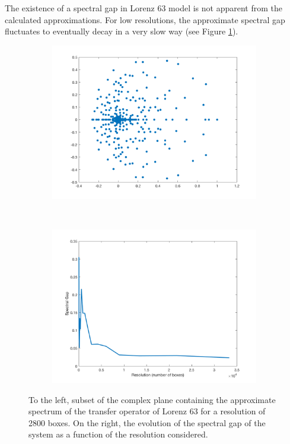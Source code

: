 The existence of a spectral gap in Lorenz 63 model is not apparent from the calculated approximations. For low resolutions, the approximate spectral gap fluctuates to eventually decay in a very slow way (see Figure \ref{sp}).

\begin{figure}[H]
	\centering
	\begin{subfigure}[b]{0.4\textwidth}
		\includegraphics[width=\textwidth]{spectruml63.png}
	\end{subfigure}
	~ %
	\begin{subfigure}[b]{0.4\textwidth}
		\includegraphics[width=\textwidth]{spectralgapl63.png}
	\end{subfigure}
	\caption{\label{sp} To the left, subset of the complex plane containing the approximate spectrum of the transfer operator of Lorenz 63 for a resolution of 2800 boxes. On the right, the evolution of the spectral gap of the system as a function of the resolution considered.}
\end{figure}
